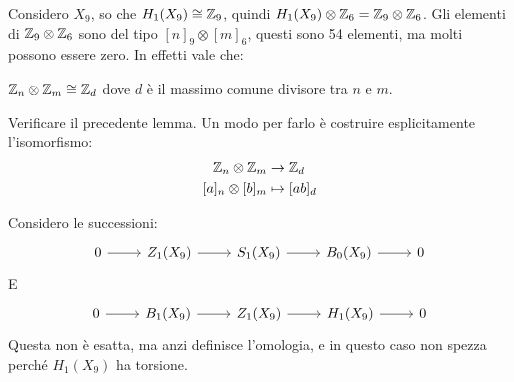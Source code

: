 \begin{example}
  Considero $ X_9 $, so che $ H_1(X_9) \cong \mathbb{Z}_9 $, quindi $ H_1(X_9) \otimes \mathbb{Z}_6 = \mathbb{Z}_9 \otimes \mathbb{Z}_6 $.
  Gli elementi di $ \mathbb{Z}_9 \otimes \mathbb{Z}_6 $ sono del tipo $ [n]_9 \otimes [m]_6 $, questi sono 54 elementi,
  ma molti possono essere zero. In effetti vale che:
  \begin{lemma}
    $ \mathbb{Z}_n \otimes \mathbb{Z}_m \cong \mathbb{Z}_d $ dove $ d $ è il massimo comune divisore tra $ n $ e $ m $.
  \end{lemma}
  \begin{exercise}
    Verificare il precedente lemma. Un modo per farlo è costruire esplicitamente
    l'isomorfismo:
    \begin{align*}
      \mathbb{Z}_n \otimes \mathbb{Z}_m & \to \mathbb{Z}_d \\
      [a]_n \otimes [b]_m & \mapsto [ab]_d
    \end{align*}
  \end{exercise}
  Considero le successioni:
  \[
    \begin{tikzcd}
      0 \rar & Z_1(X_9) \rar & S_1(X_9) \rar & B_0(X_9) \rar & 0
    \end{tikzcd}
  \]
  E
  \[
    \begin{tikzcd}
      0 \rar & B_1(X_9) \rar & Z_1(X_9) \rar & H_1(X_9) \rar & 0
    \end{tikzcd}
  \]
  Questa non è esatta, ma anzi definisce l'omologia, e in questo caso non spezza
  perché $ H_1(X_9) $ ha torsione.
\end{example}
